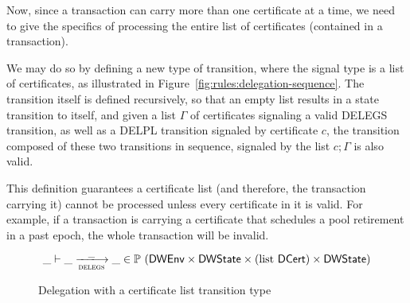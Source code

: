 Now, since a transaction can carry more than one certificate at a time, we need
to give the specifics of processing the entire list of certificates (contained
in a transaction).

We may do so by defining a new type of transition, where the signal type is a
list of certificates, as illustrated in Figure~\ref{fig:rules:delegation-sequence}.
The transition itself is defined recursively, so that
an empty list results in a state transition to itself, and given
a list $\Gamma$ of certificates signaling a valid DELEGS transition, as well
as a DELPL transition signaled by certificate $c$, the transition
composed of these two transitions in sequence, signaled by the list $c; \Gamma$
is also valid.

This definition guarantees a certificate list (and therefore, the transaction
carrying it) cannot be processed unless every
certificate in it is valid. For example, if a transaction is carrying a
certificate that schedules a pool retirement in a past epoch, the
whole transaction will be invalid.


\begin{figure}
\begin{equation*}
  \_ \vdash \_ \trans{delegs}{\_} \_ \in
    \powerset (
      \DWEnv \times \DWState \times (\text{list~} \DCert) \times \DWState)
\end{equation*}
\caption{Delegation with a certificate list transition type}
\label{fig:type:delegations}
\end{figure}


